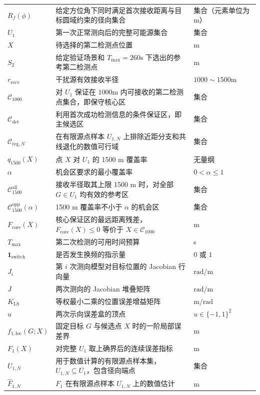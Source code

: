 \begin{longtable}{@{}p{}p{}p{}@{}}
$R_f(\phi)$ & 给定方位角下同时满足首次接收距离与目标圆域约束的径向集合 & 集合（元素单位为 m） \\
$U_1$ & 第一次正常测向后的完整可能源集合 & 集合 \\
$X$ & 待选择的第二检测点位置 & m \\
$S_2$ & 给定验证场景和 $T_{\max}=260\mathrm{s}$ 下选出的参考第二检测点 & m \\
$r_{\mathrm{recv}}$ & 干扰源有效接收半径 & $1000\sim1500\mathrm{m}$ \\
$\mathcal C_{1000}$ & 对 $U_1$ 保证在 $1000\mathrm{m}$ 内可接收的第二检测点集合，即保守核心区 & 集合 \\
$\mathcal C_{\det}$ & 利用首次成功检测信息的条件保证区，即主候选区 & 集合 \\
$\mathcal C_{\mathrm{reg},N}$ & 在有限源点样本 $U_{1,N}$ 上排除近距分支和共线退化的数值可行域 & 集合 \\
$q_{1500}(X)$ & 点 $X$ 对 $U_1$ 的 1500 m 覆盖率 & 无量纲 \\
$\alpha$ & 机会区要求的最小覆盖率 & $0<\alpha\le1$ \\
$\mathcal C_{1500}^{\mathrm{all}}$ & 接收半径取其上限 1500 m 时，对全部 $G\in U_1$ 均有效的参考区 & 集合 \\
$\mathcal C_{1500}^{\mathrm{opp}}(\alpha)$ & 1500 m 覆盖率不小于 $\alpha$ 的机会区 & 集合 \\
$F_{\mathrm{core}}(X)$ & 核心保证区的最远距离残差，$F_{\mathrm{core}}(X)\le0$ 等价于 $X\in\mathcal C_{1000}$ & m \\
$T_{\max}$ & 第二次检测的可用时间预算 & s \\
$\mathbf 1_{\mathrm{switch}}$ & 是否发生换频的指示量 & $0$ 或 $1$ \\
$J_i$ & 第 $i$ 次测向模型对目标位置的 Jacobian 行向量 & $\mathrm{rad/m}$ \\
$J$ & 两次测向的 Jacobian 堆叠矩阵 & $\mathrm{rad/m}$ \\
$K_{\mathrm{LS}}$ & 等权最小二乘的位置误差增益矩阵 & $\mathrm{m/rad}$ \\
$u$ & 两次示向误差盒的顶点 & $u\in\{-1,1\}^2$ \\
$f_{1,\mathrm{loc}}(G;X)$ & 固定目标 $G$ 与候选点 $X$ 时的一阶局部误差界 & m \\
$F_1(X)$ & 对完整 $U_1$ 取上确界后的连续误差指标 & m \\
$U_{1,N}$ & 用于数值计算的有限源点样本集，$U_{1,N}\subseteq\overline{U_1}$，包含径向端点 & 集合 \\
$\widehat F_{1,N}$ & $F_1$ 在有限源点样本 $U_{1,N}$ 上的数值估计 & m \\

\end{longtable}
